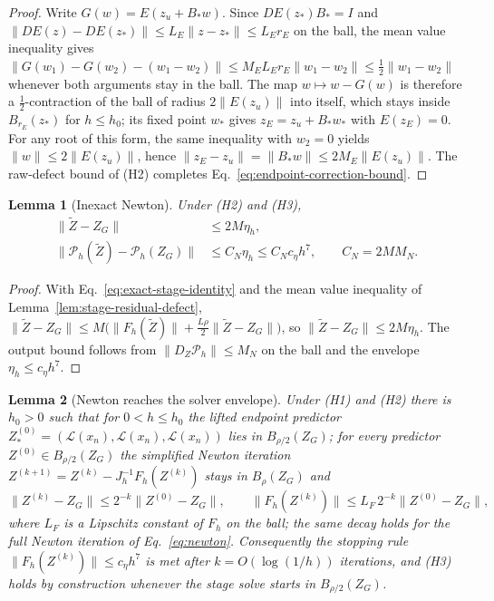 \documentclass[preprint,12pt]{elsarticle}
\newtheorem{lemma}{Lemma}
\begin{document}
\begin{proof}
Write $G(w)=E(z_u+B_\ast w)$. Since $DE(z_\ast)B_\ast=I$ and
$\|DE(z)-DE(z_\ast)\|\le L_E\|z-z_\ast\|\le L_Er_E$ on the ball, the mean value inequality gives
$\|G(w_1)-G(w_2)-(w_1-w_2)\|\le M_{E}L_Er_E\|w_1-w_2\|\le\tfrac12\|w_1-w_2\|$ whenever both
arguments stay in the ball. The map $w\mapsto w-G(w)$ is therefore a $\tfrac12$-contraction of the
ball of radius $2\|E(z_u)\|$ into itself, which stays inside $B_{r_E}(z_\ast)$ for $h\le h_0$; its
fixed point $w_\ast$ gives $z_E=z_u+B_\ast w_\ast$ with $E(z_E)=0$. For any root of this form, the
same inequality with $w_2=0$ yields $\|w\|\le2\|E(z_u)\|$, hence
$\|z_E-z_u\|=\|B_\ast w\|\le2M_{E}\|E(z_u)\|$. The raw-defect bound of (H2) completes
Eq.~\eqref{eq:endpoint-correction-bound}.
\end{proof}

\begin{lemma}[Inexact Newton]
\label{lem:inexact-newton}
Under (H2) and (H3),
\begin{equation}
\label{eq:inexact-newton-stage-output-bounds}
\begin{aligned}
  \|\widetilde Z-Z_G\|&\le 2M\eta_h,\\
  \|\mathcal P_h(\widetilde Z)-\mathcal P_h(Z_G)\|&\le C_N\eta_h\le C_Nc_\eta h^7,\qquad C_N=2MM_N .
\end{aligned}
\end{equation}
\end{lemma}

\begin{proof}
With Eq.~\eqref{eq:exact-stage-identity} and the mean value inequality of
Lemma~\ref{lem:stage-residual-defect},
$\|\widetilde Z-Z_G\|\le M\bigl(\|F_h(\widetilde Z)\|+\tfrac{L\rho}{2}\|\widetilde Z-Z_G\|\bigr)$,
so $\|\widetilde Z-Z_G\|\le 2M\eta_h$. The output bound follows from $\|D_Z\mathcal P_h\|\le M_N$ on
the ball and the envelope $\eta_h\le c_\eta h^7$.
\end{proof}

\begin{lemma}[Newton reaches the solver envelope]
\label{lem:newton-envelope}
Under (H1) and (H2) there is $h_0>0$ such that for $0<h\le h_0$ the lifted endpoint predictor
$Z^{(0)}_\ast=(\mathcal L(x_n),\mathcal L(x_n),\mathcal L(x_n))$ lies in $B_{\rho/2}(Z_G)$; for
every predictor $Z^{(0)}\in B_{\rho/2}(Z_G)$ the simplified Newton iteration
$Z^{(k+1)}=Z^{(k)}-J_h^{-1}F_h(Z^{(k)})$ stays in $B_\rho(Z_G)$ and
\begin{equation}
  \|Z^{(k)}-Z_G\|\le 2^{-k}\|Z^{(0)}-Z_G\|,\qquad
  \|F_h(Z^{(k)})\|\le L_F\,2^{-k}\|Z^{(0)}-Z_G\| ,
  \label{eq:newton-envelope-decay}
\end{equation}
where $L_F$ is a Lipschitz constant of $F_h$ on the ball; the same decay holds for the full Newton
iteration of Eq.~\eqref{eq:newton}. Consequently the stopping rule $\|F_h(Z^{(k)})\|\le c_\eta h^7$
is met after $k=O(\log(1/h))$ iterations, and (H3) holds by construction whenever the stage solve
starts in $B_{\rho/2}(Z_G)$.
\end{lemma}
\end{document}
